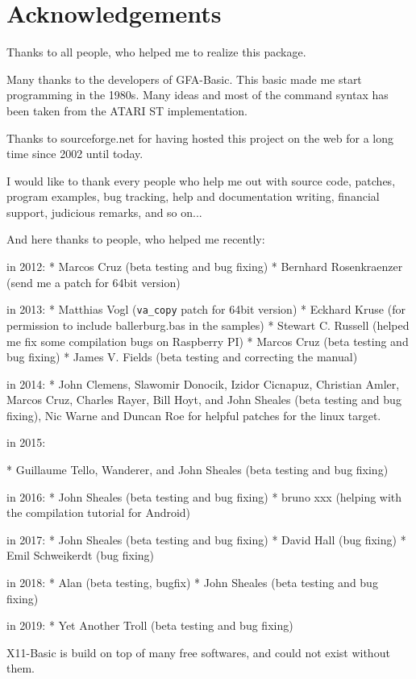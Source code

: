 
\chapter*{Acknowledgements}

Thanks to all people, who helped me to realize this package.

Many  thanks  to  the developers of GFA-Basic. This basic made me
start programming in the 1980s. Many ideas and most of  the  command 
syntax has been taken from the ATARI ST implementation.

Thanks to sourceforge.net for having hosted this project on the web for 
a long time since 2002 until today.

I would like to thank every people who help me out with source code, 
patches, program examples, bug tracking, help and documentation writing, 
financial support, judicious remarks, and so on...   

And here thanks to people, who helped me recently:

in 2012:
* Marcos Cruz (beta testing and bug fixing)
* Bernhard Rosenkraenzer (send me a patch for 64bit version)

in 2013:
* Matthias Vogl (\verb|va_copy| patch for 64bit version)
* Eckhard Kruse (for permission to include ballerburg.bas in the samples)
* Stewart C. Russell (helped me fix some compilation bugs on Raspberry PI)
* Marcos Cruz (beta testing and bug fixing)
* James V. Fields (beta testing and correcting the manual)

in 2014:
* John Clemens, Slawomir Donocik, Izidor Cicnapuz, Christian Amler,
  Marcos Cruz, Charles Rayer, Bill Hoyt, and John Sheales (beta testing and 
  bug fixing),
  Nic Warne and Duncan Roe for helpful patches for the linux target.

in 2015:

* Guillaume Tello, Wanderer, and John Sheales  (beta testing and bug fixing)

in 2016:
* John Sheales  (beta testing and bug fixing)
* bruno xxx (helping with the compilation tutorial for Android)

in 2017:
* John Sheales  (beta testing and bug fixing)
* David Hall  (bug fixing)
* Emil Schweikerdt  (bug fixing)

in 2018:
* Alan (beta testing, bugfix)
* John Sheales  (beta testing and bug fixing)

in 2019:
* Yet Another Troll  (beta testing and bug fixing)


X11-Basic is build on top of many free softwares, and could not exist without 
them.

